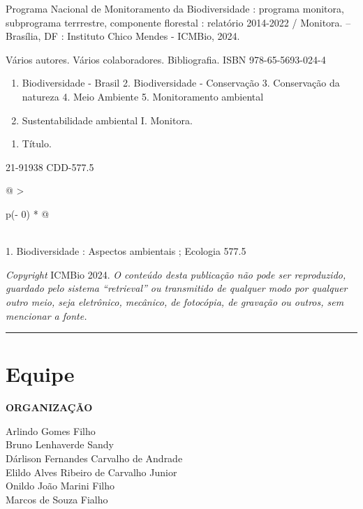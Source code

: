 \documentclass[
  letterpaper,
]{scrbook}
\providecommand{\tightlist}{%
  \setlength{\itemsep}{0pt}\setlength{\parskip}{0pt}}\usepackage{longtable,booktabs,array}
\begin{document}
Programa Nacional de Monitoramento da Biodiversidade : programa
monitora, subprograma terrrestre, componente florestal : relatório
2014-2022 / Monitora. -- Brasília, DF : Instituto Chico Mendes - ICMBio,
2024.

Vários autores. Vários colaboradores. Bibliografia. ISBN
978-65-5693-024-4

\begin{enumerate}
\def\labelenumi{\arabic{enumi}.}
\tightlist
\item
  Biodiversidade - Brasil 2. Biodiversidade - Conservação 3. Conservação
  da natureza 4. Meio Ambiente 5. Monitoramento ambiental
\item
  Sustentabilidade ambiental I. Monitora.
\end{enumerate}

\begin{enumerate}
\def\labelenumi{\Roman{enumi}.}
\setcounter{enumi}{1}
\tightlist
\item
  Título.
\end{enumerate}

21-91938 CDD-577.5

\begin{longtable}[]{@{}
  >{\raggedright\arraybackslash}p{(\columnwidth - 0\tabcolsep) * }@{}}
\toprule\noalign{}
\endhead
\bottomrule\noalign{}
\endlastfoot
 \\
1. Biodiversidade : Aspectos ambientais ; Ecologia 577.5 \\
\end{longtable}

\emph{Copyright} ICMBio 2024. \emph{O conteúdo desta publicação não pode
ser reproduzido, guardado pelo sistema ``retrieval'' ou transmitido de
qualquer modo por qualquer outro meio, seja eletrônico, mecânico, de
fotocópia, de gravação ou outros, sem mencionar a fonte.}

\begin{center}\rule{0.5\linewidth}{0.5pt}\end{center}


\chapter*{Equipe}\label{equipe}


\textbf{ORGANIZAÇÃO}

Arlindo Gomes Filho\\
Bruno Lenhaverde Sandy\\
Dárlison Fernandes Carvalho de Andrade\\
Elildo Alves Ribeiro de Carvalho Junior\\
Onildo João Marini Filho\\
Marcos de Souza Fialho
\end{document}
